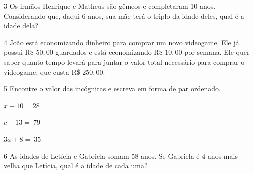 \EP[1]

\num{3} Os irmãos Henrique e Matheus são gêmeos e completaram 10 anos.
Considerando que, daqui 6 anos, sua mãe terá o triplo da idade deles,
qual é a idade dela?


\num{4} João está economizando dinheiro para comprar um novo videogame. Ele
já possui R\$ $50,00$ guardados e está economizando R\$ $10,00$ por semana.
Ele quer saber quanto tempo levará para juntar o valor total necessário
para comprar o videogame, que custa R\$ $250,00$.


\num{5} Encontre o valor das incógnitas e escreva em forma de par ordenado.

\begin{escolha}[itemsep=10pt]
\item $x + 10 = 28$ 
\item $c - 13 = \ 79$ 
\item $3a + 8 = \ 35$ 
\end{escolha}


\num{6} As idades de Letícia e Gabriela somam 58 anos. Se Gabriela é 4 anos
mais velha que Letícia, qual é a idade de cada uma?

